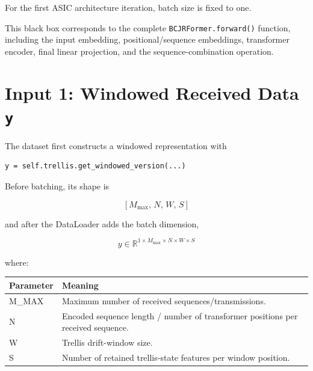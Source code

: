 \documentclass[11pt,a4paper]{article}
\begin{document}
For the first ASIC architecture iteration, batch size is fixed to one.

\begin{center}
\end{center}

This black box corresponds to the complete \texttt{BCJRFormer.forward()} function,
including the input embedding, positional/sequence embeddings, transformer
encoder, final linear projection, and the sequence-combination operation.

\section{Input 1: Windowed Received Data \texttt{y}}

The dataset first constructs a windowed representation with

\begin{verbatim}
y = self.trellis.get_windowed_version(...)
\end{verbatim}

Before batching, its shape is

\[
[M_{\max},\,N,\,W,\,S]
\]

and after the DataLoader adds the batch dimension,

\[
\boxed{
y \in \mathbb{R}^{1 \times M_{\max} \times N \times W \times S}
}
\]

where:

\begin{table}[h]
\centering
\begin{tabular}{>{\ttfamily}l p{9.5cm}}
\toprule
\textnormal{Parameter} & \textnormal{Meaning} \\
\midrule
M\_MAX & Maximum number of received sequences/transmissions. \\
N & Encoded sequence length / number of transformer positions per received sequence. \\
W & Trellis drift-window size. \\
S & Number of retained trellis-state features per window position. \\
\bottomrule
\end{tabular}
\end{table}
\end{document}
